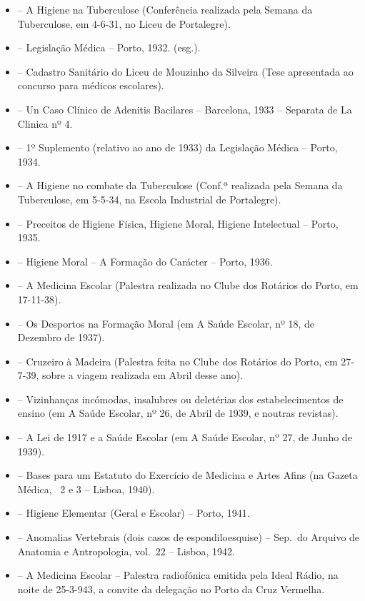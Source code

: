 \documentclass[9pt]{article}
\begin{document}
{\begin{itemize}
\item[1] -- A Higiene na Tuberculose (Conferência realizada pela Semana da Tuberculose, em 4-6-31, no Liceu de Portalegre).
\item[2] -- Legisla\-ção Médica -- Porto, 1932. (esg.).
\item[3] -- Cadastro Sanitário do Liceu de Mouzinho da Silveira (Tese apresentada ao concurso para médicos escolares).
\item[4] -- Un Caso Clínico de Adenitis Bacilares -- Barcelona, 1933 -- Separata de La Clinica nº 4.
\item[5] -- 1º Suplemento (relativo ao ano de 1933) da Legisla\-ção Médica -- Porto, 1934.
\item[6] -- A Higiene no combate da Tuberculose (Conf.ª realizada pela Semana da Tuberculose, em 5-5-34, na Escola Industrial de Portalegre).
\item[7] -- Preceitos de Higiene Física, Higiene Moral, Higiene Intelectual -- Porto, 1935.
\item[8] -- Higiene Moral – A Forma\-ção do Carácter -- Porto, 1936.
\item[9] -- A Medicina Escolar (Palestra realizada no Clube dos Rotários do Porto, em 17-11-38).
\item[10] -- Os Desportos na Forma\-ção Moral (em A Saúde Escolar, nº 18, de Dezembro de 1937).
\item[11] -- Cruzeiro à Madeira (Palestra feita no Clube dos Rotários do Porto, em 27-7-39, sobre a viagem realizada em Abril desse ano).
\item[12] -- Vizinhan\-ças incómodas, insalubres ou deletérias dos estabelecimentos de ensino (em A Saúde Escolar, nº 26, de Abril de 1939, e noutras revistas).
\item[13] -- A Lei de 1917 e a Saúde Escolar (em A Saúde Escolar, nº 27, de Junho de 1939).
\item[14] -- Bases para um Estatuto do Exercício de Medicina e Artes Afins (na Gazeta Médica, \nos\ 2 e 3 -- Lisboa, 1940).
\item[15] -- Higiene Elementar (Geral e Escolar) -- Porto, 1941.
\item[16] -- Anomalias Vertebrais (dois casos de espondiloesquise) -- Sep.\ do Arquivo de Anatomia e Antropologia, vol.\ 22 -- Lisboa, 1942.
\item[17] -- A Medicina Escolar -- Palestra radiofónica emitida pela Ideal Rádio, na noite de 25-3-943, a convite da delega\-ção no Porto da Cruz Verme\-lha.

\end{itemize}}
\end{document}
